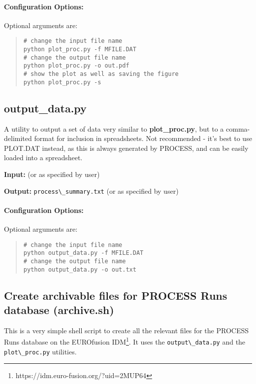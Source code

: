 \paragraph{Configuration Options:}

Optional arguments are:
\begin{quote}
\begin{verbatim}
# change the input file name
python plot_proc.py -f MFILE.DAT
# change the output file name
python plot_proc.py -o out.pdf
# show the plot as well as saving the figure
python plot_proc.py -s
\end{verbatim}
\end{quote}

\subsection{output\_data.py}

A utility to output a set of data very similar to {\bf plot\_proc.py}, but to a comma-delimited format for inclusion in spreadsheets.
Not recommended - it's best to use PLOT.DAT instead, as this is always generated by PROCESS, and can be easily loaded into a spreadsheet.
\begin{description}
\item{\textbf{Input:}}
 \mfile (or as specified by user)

\item{\textbf{Output:}}
\verb|process\_summary.txt| (or as specified by user)
\end{description}

\paragraph{Configuration Options:}

Optional arguments are:
\begin{quote}
\begin{verbatim}
# change the input file name
python output_data.py -f MFILE.DAT
# change the output file name
python output_data.py -o out.txt
\end{verbatim}
\end{quote}

\subsection{Create archivable files for PROCESS Runs database (archive.sh)}

This is a very simple shell script to create all the relevant files for the PROCESS Runs database on the EUROfusion IDM\footnote{https://idm.euro-fusion.org/?uid=2MUP64}. It uses the \verb|output\_data.py| and the \verb|plot\_proc.py| utilities.

